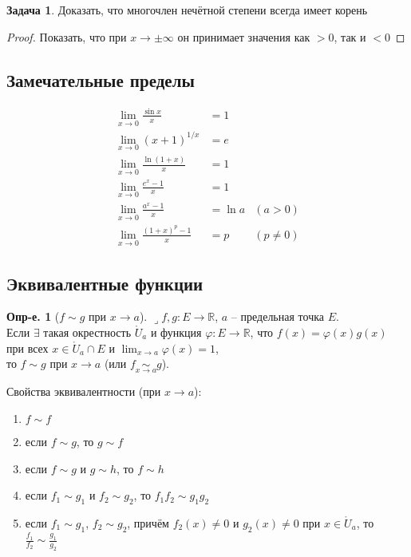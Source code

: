 \documentclass[a4paper,12pt]{article}
\numberwithin{figure}{section}
\theoremstyle{definition}
\newtheorem{definition}{Опр-е.}[section]
\newtheorem{problem}{Задача}[section]
\def\DS{\displaystyle}
\def\RR{\mathbb{R}}
\def\on{\!:}
\def\ringU{\mathring{U}}
\def\lets{{\huge$\lrcorner$}\space}
\begin{document}
\begin{problem}Доказать, что многочлен нечётной степени всегда имеет корень\end{problem}
\begin{proof}Показать, что при $x\to\pm\infty$ он принимает значения как $>0$, так и $<0$\end{proof}


\subsection{Замечательные пределы}

\begin{align*}
	   \lim_{x\to 0} \frac{\sin x}x &= 1
	\\ \lim_{x\to 0} \left(x+1\right)^{1/x} &= e
	\\ \lim_{x\to 0} \frac{\ln(1+x)}x &= 1
	\\ \lim_{x\to 0} \frac{e^x-1}x &= 1
	\\ \lim_{x\to 0} \frac{a^x-1}x &= \ln a    &(a>0)
	\\ \lim_{x\to 0} \frac{(1+x)^p-1}x &= p   &(p \ne 0)
\end{align*}


\subsection{Эквивалентные функции}

\begin{definition}[$f \sim g$ при $x \to a$]
	\lets $f,g\on E\to \RR$, $a$ -- предельная точка $E$. \\
	Если $\exists$ такая окрестность $\ringU_a$ и функция $\varphi\on E\to\RR$,
	что $f(x)=\varphi(x)g(x)$ при всех $x\in\ringU_a\cap E$
	и $\DS \lim_{x\to a}\varphi(x)=1$,\\
	то $f \sim g$ при $x\to a$ (или $\DS f \underset{x\to a}{\sim} g$).
\end{definition}

Свойства эквивалентности (при $x \to a$): \begin{enumerate}
	\item $f \sim f$
	\item если $f \sim g$, то $g \sim f$
	\item если $f \sim g$ и $g \sim h$, то $f \sim h$
	\item если $f_1 \sim g_1$ и $f_2 \sim g_2$, то $f_1 f_2 \sim g_1 g_2$
	\item если $f_1 \sim g_1$, $f_2 \sim g_2$, причём
		  $f_2(x)\ne0$ и $g_2(x)\ne0$ при $x\in \ringU_a$,
		  то $\DS \frac{f_1}{f_2} \sim \frac{g_1}{g_2}$
\end{enumerate}
\end{document}
